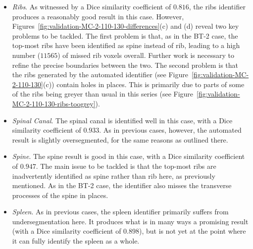 \begin{itemize}
\item \emph{Ribs}. As witnessed by a Dice similarity coefficient of $0.816$, the ribs identifier produces a reasonably good result in this case. However, Figures~\ref{fig:validation-MC-2-110-130-differences}(c) and (d) reveal two key problems to be tackled. The first problem is that, as in the BT-2 case, the top-most ribs have been identified as spine instead of rib, leading to a high number ($11565$) of missed rib voxels overall. Further work is necessary to refine the precise boundaries between the two. The second problem is that the ribs generated by the automated identifier (see Figure~\ref{fig:validation-MC-2-110-130}(c)) contain holes in places. This is primarily due to parts of some of the ribs being greyer than usual in this series (see Figure~\ref{fig:validation-MC-2-110-130-ribs-toogrey}).

\item \emph{Spinal Canal}. The spinal canal is identified well in this case, with a Dice similarity coefficient of $0.933$. As in previous cases, however, the automated result is slightly oversegmented, for the same reasons as outlined there.

\item \emph{Spine}. The spine result is good in this case, with a Dice similarity coefficient of $0.947$. The main issue to be tackled is that the top-most ribs are inadvertently identified as spine rather than rib here, as previously mentioned. As in the BT-2 case, the identifier also misses the transverse processes of the spine in places.

\item \emph{Spleen}. As in previous cases, the spleen identifier primarily suffers from undersegmentation here. It produces what is in many ways a promising result (with a Dice similarity coefficient of $0.898$), but is not yet at the point where it can fully identify the spleen as a whole.

\end{itemize}

